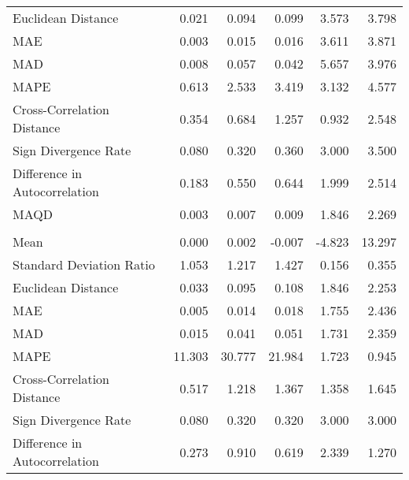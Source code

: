 \begin{landscape}
\begin{ThreePartTable}
\begin{longtable}[t]{lrrrrr}
\hspace{1em}Euclidean Distance & 0.021 & 0.094 & 0.099 & 3.573 & 3.798\\
\hspace{1em}MAE & 0.003 & 0.015 & 0.016 & 3.611 & 3.871\\
\hspace{1em}MAD & 0.008 & 0.057 & 0.042 & 5.657 & 3.976\\
\hspace{1em}MAPE & 0.613 & 2.533 & 3.419 & 3.132 & 4.577\\
\hspace{1em}Cross-Correlation Distance & 0.354 & 0.684 & 1.257 & 0.932 & 2.548\\
\hspace{1em}Sign Divergence Rate & 0.080 & 0.320 & 0.360 & 3.000 & 3.500\\
\hspace{1em}Difference in Autocorrelation & 0.183 & 0.550 & 0.644 & 1.999 & 2.514\\
\hspace{1em}MAQD & 0.003 & 0.007 & 0.009 & 1.846 & 2.269\\
\addlinespace[0.5em]
\multicolumn{6}{l}{\textbf{HRV}}\\
\hline
\hspace{1em}Mean & 0.000 & 0.002 & -0.007 & -4.823 & 13.297\\
\hspace{1em}Standard Deviation Ratio & 1.053 & 1.217 & 1.427 & 0.156 & 0.355\\
\hspace{1em}Euclidean Distance & 0.033 & 0.095 & 0.108 & 1.846 & 2.253\\
\hspace{1em}MAE & 0.005 & 0.014 & 0.018 & 1.755 & 2.436\\
\hspace{1em}MAD & 0.015 & 0.041 & 0.051 & 1.731 & 2.359\\
\hspace{1em}MAPE & 11.303 & 30.777 & 21.984 & 1.723 & 0.945\\
\hspace{1em}Cross-Correlation Distance & 0.517 & 1.218 & 1.367 & 1.358 & 1.645\\
\hspace{1em}Sign Divergence Rate & 0.080 & 0.320 & 0.320 & 3.000 & \vphantom{1} 3.000\\
\hspace{1em}Difference in Autocorrelation & 0.273 & 0.910 & 0.619 & 2.339 & 1.270\\

\end{longtable}
\end{ThreePartTable}
\end{landscape}
